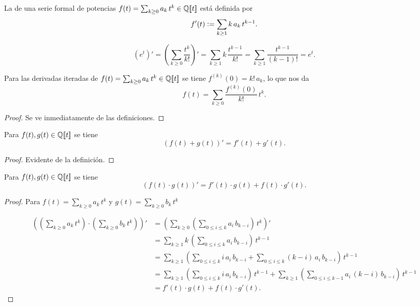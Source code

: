 \documentclass{article}
\begin{document}
\begin{definicion*}
La  de una serie formal de potencias $f (t) = \sum_{k \ge 0} a_k\,t^k \in \mathbb{Q} [\![t]\!]$ está definida por
$$f' (t) \mathrel{\mathop:}= \sum_{k \ge 1} k\,a_k\,t^{k-1}.$$
\end{definicion*}

\begin{ejemplo*}
$$(e^t)' = \left(\sum_{k \ge 0} \frac{t^k}{k!}\right)' = \sum_{k \ge 1} k\,\frac{t^{k-1}}{k!} = \sum_{k \ge 1} \frac{t^{k-1}}{(k-1)!} = e^t.$$
\end{ejemplo*}

\begin{observacion*}
\label{serie-de-Taylor-formal}
Para las derivadas iteradas de $f (t) = \sum_{k \ge 0} a_k \, t^k \in \mathbb{Q} [\![t]\!]$ se tiene $f^{(k)} (0) = k! \, a_k$, lo que nos da
$$f (t) = \sum_{k \ge 0} \frac{f^{(k)} (0)}{k!}\,t^k.$$

\begin{proof}
Se ve inmediatamente de las definiciones.
\end{proof}
\end{observacion*}

\begin{observacion*}
Para $f (t), g (t) \in \mathbb{Q} [\![t]\!]$ se tiene
$$(f (t) + g (t))' = f' (t) + g' (t).$$

\begin{proof}
Evidente de la definición.
\end{proof}
\end{observacion*}

\begin{observacion*}
Para $f (t), g (t) \in \mathbb{Q} [\![t]\!]$ se tiene
$$(f (t)\cdot g (t))' = f' (t)\cdot g (t) + f (t)\cdot g' (t).$$

\pagebreak

\begin{proof}
Para $f (t) = \sum_{k \ge 0} a_k\,t^k$ y $g (t) = \sum_{k \ge 0} b_k\,t^k$

\begin{align*}
\left( \left(\sum_{k\ge 0} a_k\,t^k\right)\cdot \left(\sum_{k\ge 0} b_k\,t^k\right) \right)' & = \left(\sum_{k\ge 0} \left(\sum_{0 \le i \le k} a_i\,b_{k-i}\right)\,t^k\right)' \\
 & = \sum_{k\ge 1} k\,\left(\sum_{0 \le i \le k} a_i\,b_{k-i}\right)\,t^{k-1} \\
 & = \sum_{k\ge 1} \left(\sum_{0 \le i \le k} i \, a_i\,b_{k-i} + \sum_{0 \le i \le k} (k-i) \, a_i\,b_{k-i}\right)\,t^{k-1} \\
 & = \sum_{k \ge 1} \left(\sum_{0 \le i \le k} i \, a_i\,b_{k-i}\right)\,t^{k-1} + \sum_{k \ge 1} \left(\sum_{0 \le i \le k-1} a_i\,(k-i)\,b_{k-i}\right)\,t^{k-1} \\
 & = f' (t)\cdot g (t) + f (t)\cdot g' (t).
 \end{align*}
\end{proof}
\end{observacion*}
\end{document}
